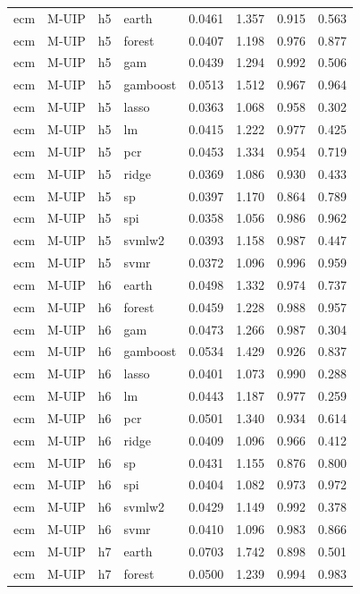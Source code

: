 \begin{ThreePartTable}
\begin{longtable}[t]{llclcccc}
\addlinespace
ecm & M-UIP & h5 & earth & 0.0461 & 1.357 & 0.915 & 0.563\\
ecm & M-UIP & h5 & forest & 0.0407 & 1.198 & 0.976 & 0.877\\
ecm & M-UIP & h5 & gam & 0.0439 & 1.294 & 0.992 & 0.506\\
ecm & M-UIP & h5 & gamboost & 0.0513 & 1.512 & 0.967 & 0.964\\
ecm & M-UIP & h5 & lasso & 0.0363 & 1.068 & 0.958 & 0.302\\
ecm & M-UIP & h5 & lm & 0.0415 & 1.222 & 0.977 & 0.425\\
ecm & M-UIP & h5 & pcr & 0.0453 & 1.334 & 0.954 & 0.719\\
ecm & M-UIP & h5 & ridge & 0.0369 & 1.086 & 0.930 & 0.433\\
ecm & M-UIP & h5 & sp & 0.0397 & 1.170 & 0.864 & 0.789\\
ecm & M-UIP & h5 & spi & 0.0358 & 1.056 & 0.986 & 0.962\\
ecm & M-UIP & h5 & svmlw2 & 0.0393 & 1.158 & 0.987 & 0.447\\
ecm & M-UIP & h5 & svmr & 0.0372 & 1.096 & 0.996 & 0.959\\
\addlinespace
ecm & M-UIP & h6 & earth & 0.0498 & 1.332 & 0.974 & 0.737\\
ecm & M-UIP & h6 & forest & 0.0459 & 1.228 & 0.988 & 0.957\\
ecm & M-UIP & h6 & gam & 0.0473 & 1.266 & 0.987 & 0.304\\
ecm & M-UIP & h6 & gamboost & 0.0534 & 1.429 & 0.926 & 0.837\\
ecm & M-UIP & h6 & lasso & 0.0401 & 1.073 & 0.990 & 0.288\\
ecm & M-UIP & h6 & lm & 0.0443 & 1.187 & 0.977 & 0.259\\
ecm & M-UIP & h6 & pcr & 0.0501 & 1.340 & 0.934 & 0.614\\
ecm & M-UIP & h6 & ridge & 0.0409 & 1.096 & 0.966 & 0.412\\
ecm & M-UIP & h6 & sp & 0.0431 & 1.155 & 0.876 & 0.800\\
ecm & M-UIP & h6 & spi & 0.0404 & 1.082 & 0.973 & 0.972\\
ecm & M-UIP & h6 & svmlw2 & 0.0429 & 1.149 & 0.992 & 0.378\\
ecm & M-UIP & h6 & svmr & 0.0410 & 1.096 & 0.983 & 0.866\\
\addlinespace
ecm & M-UIP & h7 & earth & 0.0703 & 1.742 & 0.898 & 0.501\\
ecm & M-UIP & h7 & forest & 0.0500 & 1.239 & 0.994 & 0.983\\

\end{longtable}
\end{ThreePartTable}
